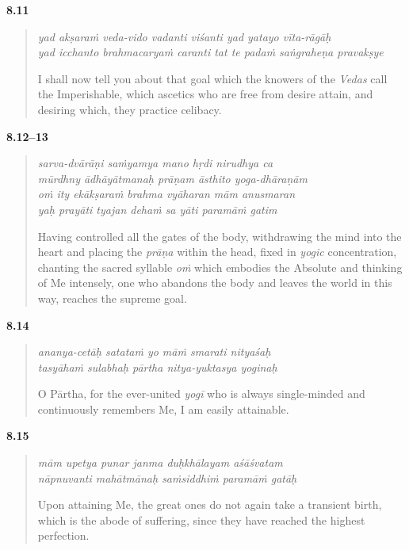 \par\noindent\textbf{8.11}\par
\begin{verse}
\textit{yad akṣaraṁ veda-vido vadanti viśanti yad yatayo vīta-rāgāḥ} \\
\textit{yad icchanto brahmacaryaṁ caranti tat te padaṁ saṅgraheṇa pravakṣye}

\noindent I shall now tell you about that goal which the knowers of the \textit{Vedas} call the Imperishable, which ascetics who are free from desire attain, and desiring which, they practice celibacy.
\end{verse}
\par



\par\noindent\textbf{8.12–13}\par
\begin{verse}
\textit{sarva-dvārāṇi saṁyamya mano hṛdi nirudhya ca} \\
\textit{mūrdhny ādhāyātmanaḥ prāṇam āsthito yoga-dhāraṇām} \\
\textit{oṁ ity ekākṣaraṁ brahma vyāharan mām anusmaran} \\
\textit{yaḥ prayāti tyajan dehaṁ sa yāti paramāṁ gatim}

\noindent Having controlled all the gates of the body, withdrawing the mind into the heart and placing the \textit{prāṇa} within the head, fixed in \textit{yogic} concentration, chanting the sacred syllable \textit{oṁ} which embodies the Absolute and thinking of Me intensely, one who abandons the body and leaves the world in this way, reaches the supreme goal.
\end{verse}
\par



\par\noindent\textbf{8.14}\par
\begin{verse}
\textit{ananya-cetāḥ satataṁ yo māṁ smarati nityaśaḥ} \\
\textit{tasyāhaṁ sulabhaḥ pārtha nitya-yuktasya yoginaḥ}

\noindent O Pārtha, for the ever-united \textit{yogī} who is always single-minded and continuously remembers Me, I am easily attainable.
\end{verse}
\par



\par\noindent\textbf{8.15}\par
\begin{verse}
\textit{mām upetya punar janma duḥkhālayam aśāśvatam} \\
\textit{nāpnuvanti mahātmānaḥ saṁsiddhiṁ paramāṁ gatāḥ}

\noindent Upon attaining Me, the great ones do not again take a transient birth, which is the abode of suffering, since they have reached the highest perfection.
\end{verse}
\par



